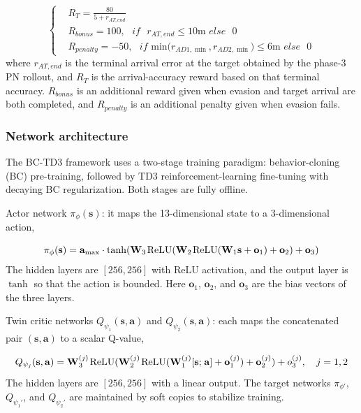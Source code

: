 \begin{equation}
\label{eq:75}
\left\{
\begin{aligned}
& {R_T} = \frac{{80}}{{5 + {r_{AT,end}}}} \\
& {R_{bonus}} = 100,{\text{ }}if{\text{ }}{r_{AT,end}} \leqslant 10{\text{m }}else{\text{ }}0 \\
& {R_{penalty}} =  - 50,{\text{ }}if{\text{ min(}}{r_{AD1,\min }},{r_{AD2,\min }}{\text{)}} \leqslant 6{\text{m }}else{\text{ }}0
\end{aligned}
\right.
\end{equation}
where ${r_{AT,end}}$ is the terminal arrival error at the target obtained by the phase-3 PN rollout, and $R_T$ is the arrival-accuracy reward based on that terminal accuracy. ${R_{bonus}}$ is an additional reward given when evasion and target arrival are both completed, and ${R_{penalty}}$ is an additional penalty given when evasion fails.

\subsubsection{Network architecture}
The BC-TD3 framework uses a two-stage training paradigm: behavior-cloning (BC) pre-training, followed by TD3 reinforcement-learning fine-tuning with decaying BC regularization. Both stages are fully offline.

Actor network ${\pi _\phi }({\mathbf{s}})$: it maps the 13-dimensional state to a 3-dimensional action,

\begin{equation}
\label{eq:76}
{\pi _\phi }({\mathbf{s}}) = {{\mathbf{a}}_{\max }} \cdot \tanh ({{\mathbf{W}}_3}{\kern 1pt} {\text{ReLU}}({{\mathbf{W}}_2}{\kern 1pt} {\text{ReLU}}({{\mathbf{W}}_1}{\mathbf{s}} + {{\mathbf{o}}_1}) + {{\mathbf{o}}_2}) + {{\mathbf{o}}_3})
\end{equation}
The hidden layers are $[256, 256]$ with ReLU activation, and the output layer is $\tanh$ so that the action is bounded. Here ${{\mathbf{o}}_1}$, ${{\mathbf{o}}_2}$, and ${{\mathbf{o}}_3}$ are the bias vectors of the three layers.

Twin critic networks ${Q_{{\psi _1}}}({\mathbf{s}},{\mathbf{a}})$ and ${Q_{{\psi _2}}}({\mathbf{s}},{\mathbf{a}})$: each maps the concatenated pair $({\mathbf{s}},{\mathbf{a}})$ to a scalar Q-value,

\begin{equation}
\label{eq:77}
{Q_{{\psi _j}}}({\mathbf{s}},{\mathbf{a}}) = {\mathbf{W}}_3^{(j)}{\kern 1pt} {\text{ReLU}}({\mathbf{W}}_2^{(j)}{\kern 1pt} {\text{ReLU}}({\mathbf{W}}_1^{(j)}[{\mathbf{s}};{\kern 1pt} {\mathbf{a}}] + {\mathbf{o}}_1^{(j)}) + {\mathbf{o}}_2^{(j)}) + o_3^{(j)},\quad j = 1,2
\end{equation}
The hidden layers are $[256, 256]$ with a linear output. The target networks \(\pi_{\phi'}\), \(Q_{\psi_1'}\), and \(Q_{\psi_2'}\) are maintained by soft copies to stabilize training.

